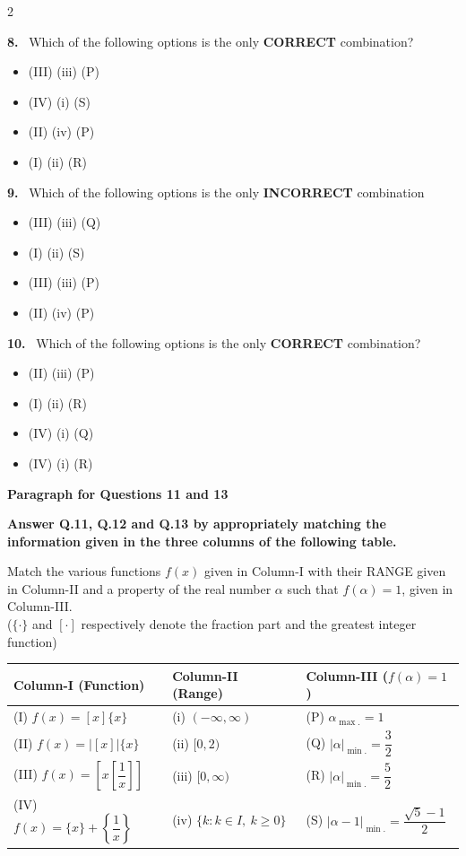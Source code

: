 \documentclass[10pt]{extarticle}
\newcommand{\qn}[1]{\par\smallskip\noindent\textbf{#1.}~}
\newcommand{\paraq}[2]{\par\smallskip\noindent\textbf{Paragraph for Questions #1 and #2}\par}
\newenvironment{qoptions}{\begin{itemize}[leftmargin=1.8em,itemsep=1pt,topsep=2pt,label={}]}{\end{itemize}}
\newcommand{\opt}[2]{\item[(#1)] #2}
\begin{document}
\begin{multicols}{2}
\qn{8} Which of the following options is the only \textbf{CORRECT} combination?
\begin{qoptions}
\opt{A}{(III) (iii) (P)}
\opt{B}{(IV) (i) (S)}
\opt{C}{(II) (iv) (P)}
\opt{D}{(I) (ii) (R)}
\end{qoptions}
\qn{9} Which of the following options is the only \textbf{INCORRECT} combination
\begin{qoptions}
\opt{A}{(III) (iii) (Q)}
\opt{B}{(I) (ii) (S)}
\opt{C}{(III) (iii) (P)}
\opt{D}{(II) (iv) (P)}
\end{qoptions}
\qn{10} Which of the following options is the only \textbf{CORRECT} combination?
\begin{qoptions}
\opt{A}{(II) (iii) (P)}
\opt{B}{(I) (ii) (R)}
\opt{C}{(IV) (i) (Q)}
\opt{D}{(IV) (i) (R)}
\end{qoptions}
\paraq{11}{13}
\noindent\textbf{Answer Q.11, Q.12 and Q.13 by appropriately matching the information given in the three columns of the following table.}\par
Match the various functions $f(x)$ given in Column-I with their RANGE given in Column-II and a property of the real number $\alpha$ such that $f(\alpha)=1$, given in Column-III.\\
($\{\cdot\}$ and $[\cdot]$ respectively denote the fraction part and the greatest integer function)
\end{multicols}
\begin{center}\small\setlength{\tabcolsep}{4pt}
\begin{tabular}{|p{4.6cm}|p{3.6cm}|p{5.2cm}|}\hline
\textbf{Column-I} (Function) & \textbf{Column-II} (Range) & \textbf{Column-III} ($f(\alpha)=1$)\\\hline
(I) $f(x)=[x]\{x\}$ & (i) $(-\infty,\infty)$ & (P) $\alpha_{\max.}=1$\\\hline
(II) $f(x)=\big|[x]\big|\{x\}$ & (ii) $[0,2)$ & (Q) $|\alpha|_{\min.}=\dfrac32$\\\hline
(III) $f(x)=\left[x\left[\dfrac1x\right]\right]$ & (iii) $[0,\infty)$ & (R) $|\alpha|_{\min.}=\dfrac52$\\\hline
(IV) $f(x)=\{x\}+\left\{\dfrac1x\right\}$ & (iv) $\{k:k\in I,\ k\ge0\}$ & (S) $|\alpha-1|_{\min.}=\dfrac{\sqrt5-1}{2}$\\\hline
\end{tabular}
\end{center}
\end{document}
